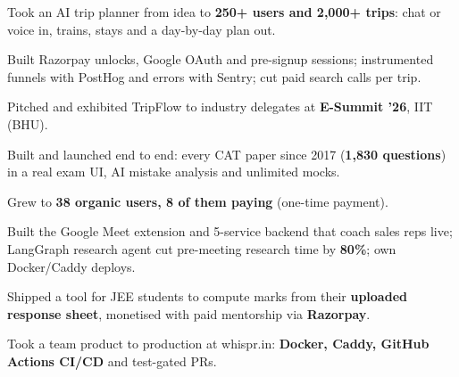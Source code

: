 \documentclass[10pt]{article}
\begin{document}
\begin{rkbody}
\begin{rkitems}
  \item Took an AI trip planner from idea to \textbf{250+ users and 2,000+ trips}: chat or voice in, trains, stays and a day-by-day plan out.
  \item Built Razorpay unlocks, Google OAuth and pre-signup sessions; instrumented funnels with PostHog and errors with Sentry; cut paid search calls per trip.
  \item Pitched and exhibited TripFlow to industry delegates at \textbf{E-Summit '26}, IIT (BHU).
\end{rkitems}
\begin{rkitems}
  \item Built and launched end to end: every CAT paper since 2017 (\textbf{1,830 questions}) in a real exam UI, AI mistake analysis and unlimited mocks.
  \item Grew to \textbf{38 organic users, 8 of them paying} (one-time payment).
\end{rkitems}
\begin{rkitems}
  \item Built the Google Meet extension and 5-service backend that coach sales reps live; LangGraph research agent cut pre-meeting research time by \textbf{80\%}; own Docker/Caddy deploys.
\end{rkitems}
\begin{rkitems}
  \item Shipped a tool for JEE students to compute marks from their \textbf{uploaded response sheet}, monetised with paid mentorship via \textbf{Razorpay}.
\end{rkitems}
\begin{rkitems}
  \item Took a team product to production at whispr.in: \textbf{Docker, Caddy, GitHub Actions CI/CD} and test-gated PRs.
\end{rkitems}


\end{rkbody}
\end{document}
